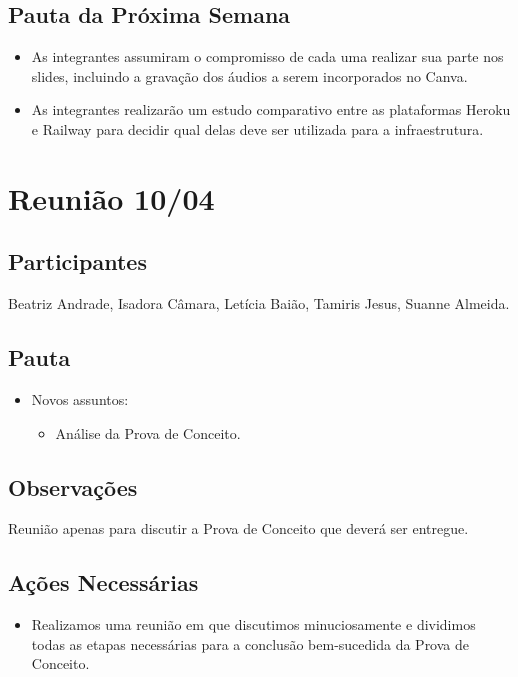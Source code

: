 \begin{apendicesenv}
\subsection*{Pauta da Próxima Semana}
\begin{itemize}
    \item As integrantes assumiram o compromisso de cada uma realizar sua parte nos slides, incluindo a gravação dos áudios a serem incorporados no Canva.
    \item As integrantes realizarão um estudo comparativo entre as plataformas Heroku e Railway para decidir qual delas deve ser utilizada para a infraestrutura.
\end{itemize}

\section*{Reunião 10/04}

\subsection*{Participantes}
Beatriz Andrade, Isadora Câmara, Letícia Baião, Tamiris Jesus, Suanne Almeida.

\subsection*{Pauta}
\begin{itemize}
    \item Novos assuntos:
    \begin{itemize}
        \item Análise da Prova de Conceito.
    \end{itemize}
\end{itemize}

\subsection*{Observações}
Reunião apenas para discutir a Prova de Conceito que deverá ser entregue.

\subsection*{Ações Necessárias}
\begin{itemize}
    \item Realizamos uma reunião em que discutimos minuciosamente e dividimos todas as etapas necessárias para a conclusão bem-sucedida da Prova de Conceito.
\end{itemize}


\end{apendicesenv}
